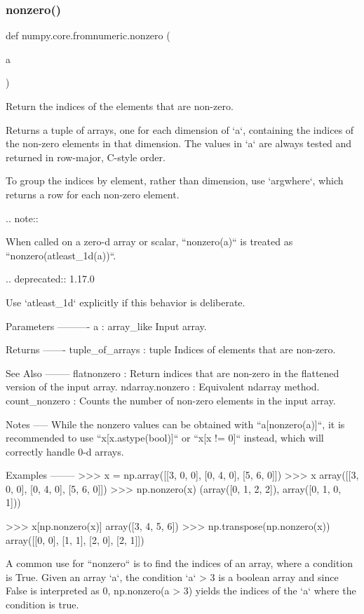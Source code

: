 \subsubsection{\texorpdfstring{nonzero()}{nonzero()}}
{\footnotesize\ttfamily def numpy.\+core.\+fromnumeric.\+nonzero (\begin{DoxyParamCaption}\item[{}]{a }\end{DoxyParamCaption})}

\begin{DoxyVerb}Return the indices of the elements that are non-zero.

Returns a tuple of arrays, one for each dimension of `a`,
containing the indices of the non-zero elements in that
dimension. The values in `a` are always tested and returned in
row-major, C-style order.

To group the indices by element, rather than dimension, use `argwhere`,
which returns a row for each non-zero element.

.. note::

   When called on a zero-d array or scalar, ``nonzero(a)`` is treated
   as ``nonzero(atleast_1d(a))``.

   .. deprecated:: 1.17.0

      Use `atleast_1d` explicitly if this behavior is deliberate.

Parameters
----------
a : array_like
    Input array.

Returns
-------
tuple_of_arrays : tuple
    Indices of elements that are non-zero.

See Also
--------
flatnonzero :
    Return indices that are non-zero in the flattened version of the input
    array.
ndarray.nonzero :
    Equivalent ndarray method.
count_nonzero :
    Counts the number of non-zero elements in the input array.

Notes
-----
While the nonzero values can be obtained with ``a[nonzero(a)]``, it is
recommended to use ``x[x.astype(bool)]`` or ``x[x != 0]`` instead, which
will correctly handle 0-d arrays.

Examples
--------
>>> x = np.array([[3, 0, 0], [0, 4, 0], [5, 6, 0]])
>>> x
array([[3, 0, 0],
       [0, 4, 0],
       [5, 6, 0]])
>>> np.nonzero(x)
(array([0, 1, 2, 2]), array([0, 1, 0, 1]))

>>> x[np.nonzero(x)]
array([3, 4, 5, 6])
>>> np.transpose(np.nonzero(x))
array([[0, 0],
       [1, 1],
       [2, 0],
       [2, 1]])

A common use for ``nonzero`` is to find the indices of an array, where
a condition is True.  Given an array `a`, the condition `a` > 3 is a
boolean array and since False is interpreted as 0, np.nonzero(a > 3)
yields the indices of the `a` where the condition is true.


\end{DoxyVerb}
